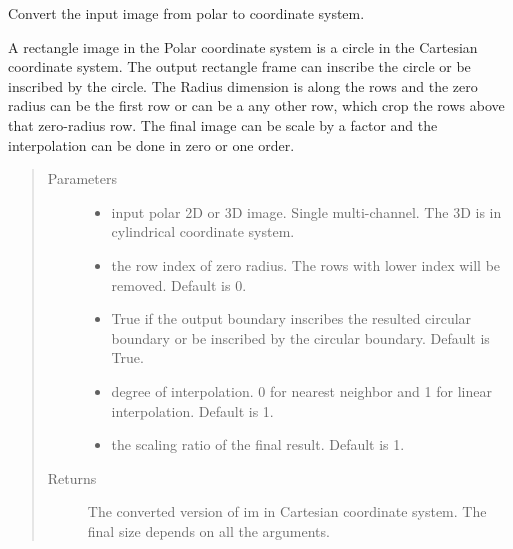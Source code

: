 \documentclass[letterpaper,10pt,english]{sphinxmanual}
\begin{document}
\begin{fulllineitems}
\label{\detokenize{index:util.polar2cartesian.polar2cartesian}}
Convert the input image from polar to  coordinate system.

A rectangle image in the Polar coordinate system is a circle in the Cartesian coordinate system.  The output
rectangle frame can inscribe the circle or be inscribed by the circle.  The Radius dimension is along the rows and
the zero radius can be the first row or can be a any other row, which crop the rows above that zero-radius row.
The final image can be scale by a factor and the interpolation can be done in zero or one order.
\begin{quote}\begin{description}
\item[{Parameters}] \leavevmode\begin{itemize}
\item {} 
 \textendash{} input polar 2D or 3D image. Single multi-channel. The 3D is in cylindrical coordinate system.

\item {} 
 \textendash{} the row index of zero radius. The rows with lower index will be removed.  Default is 0.

\item {} 
 \textendash{} True if the output boundary inscribes the resulted circular boundary or be inscribed by the circular
boundary.  Default is True.

\item {} 
 \textendash{} degree of interpolation.  0 for nearest neighbor and 1 for linear interpolation.  Default is 1.

\item {} 
 \textendash{} the scaling ratio of the final result.  Default is 1.

\end{itemize}

\item[{Returns}] \leavevmode
The converted version of im in Cartesian coordinate system.  The final size depends on all the arguments.

\end{description}\end{quote}

\end{fulllineitems}
\end{document}
